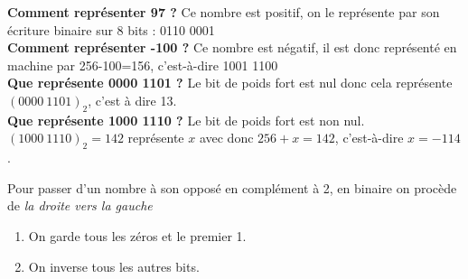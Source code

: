 \documentclass[a4paper,12pt,french]{book}
\begin{document}
\begin{center}
\end{center}

\begin{exemple}[s]
\textbf{Comment représenter 97 ?} Ce nombre est positif, on le représente par son écriture binaire sur 8 bits : 0110
0001\\

\textbf{Comment représenter -100 ?} Ce nombre est négatif, il est donc représenté en machine par 256-100=156,
c'est-à-dire 1001 1100\\

\textbf{Que représente 0000 1101 ?} Le bit de poids fort est nul donc cela représente $(0000\ 1101)_2$, c'est à dire
13.\\

\textbf{Que représente 1000 1110 ?} Le bit de poids fort est non nul. $(1000\ 1110)_2=142$ représente $x$ avec donc
$256+x=142$, c'est-à-dire $x=-114$.
\end{exemple}

\begin{methode}
	Pour passer d'un nombre à son opposé en complément à 2, en binaire on procède de \textit{la droite vers la gauche}
	\begin{enumerate}[\textbullet]
		\item 	On garde tous les zéros et le premier 1.
		\item 	On \og inverse\fg{} tous les autres bits.
	\end{enumerate}
\end{methode}
\end{document}
